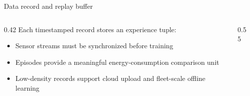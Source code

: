 \documentclass[aspectratio=169,professionalfonts]{beamer}
\begin{document}
\begin{frame}[label={sec:org6e30cd1}]{Data record and replay buffer}
\begin{columns}
\begin{column}{0.42\columnwidth}
Each timestamped record stores an experience tuple:

\begin{itemize}
\item Sensor streams must be synchronized before training
\item Episodes provide a meaningful energy-consumption comparison unit
\item Low-density records support cloud upload and fleet-scale offline
learning
\end{itemize}
\end{column}
\begin{column}{0.55\columnwidth}
\begin{center}
\tiny
\setlength{\tabcolsep}{3pt}
\renewcommand{\arraystretch}{1.08}
\end{center}
\end{column}
\end{columns}
\end{frame}
\end{document}
